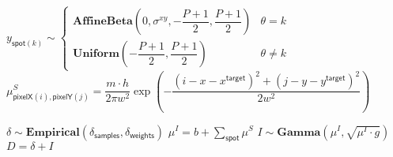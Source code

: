 \begin{algorithmic}[1]
            \State $ y_{\mathsf{spot}(k)} \sim
                \begin{cases}
                \mathbf{AffineBeta}\left( 0, \sigma^{xy}, -\dfrac{P+1}{2}, \dfrac{P+1}{2} \right) & \theta = k \\
                \mathbf{Uniform}\left(-\dfrac{P+1}{2}, \dfrac{P+1}{2} \right) & \theta \neq k \end{cases}
                $
            \State $\mu^{S}_{\mathsf{pixelX}(i), \mathsf{pixelY}(j)} =
                        \dfrac{m \cdot h}{2 \pi w^2} \exp{\left ( -\dfrac{(i-x-x^\mathsf{target})^2 + (j-y-y^\mathsf{target})^2}{2w^2} \right)}$
            \EndFor
        \EndFor
            
            \State $\delta \sim \mathbf{Empirical}( \delta_\mathsf{samples}, \delta_\mathsf{weights})$
            \State $\mu^I = b + \sum_{\mathsf{spot}} \mu^S$
            \State $I \sim \mathbf{Gamma} (\mu^I, \sqrt{\mu^I \cdot g})$
            \State $D = \delta + I$
        \EndFor
    \EndFor
\EndFor
\end{algorithmic}